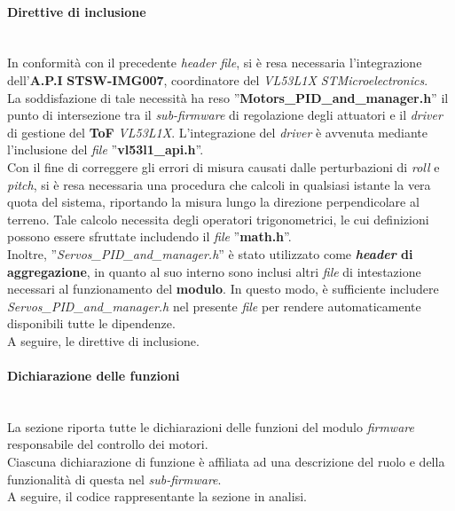 \paragraph{Direttive di inclusione}\mbox{}\\
In conformità con il precedente \textit{header file}, si è resa necessaria l'integrazione dell'\textbf{A.P.I} \textbf{STSW-IMG007}, coordinatore del \textit{VL53L1X STMicroelectronics}.\\
La soddisfazione di tale necessità ha reso ''\textbf{Motors\_PID\_and\_manager.h}'' il punto di intersezione tra il \textit{sub-firmware} di regolazione degli attuatori e il \textit{driver} di gestione del \textbf{ToF} \textit{VL53L1X}.
L'integrazione del \textit{driver} è avvenuta mediante l'inclusione del \textit{file} ''\textbf{vl53l1\_api.h}''.\\
Con il fine di correggere gli errori di misura causati dalle perturbazioni di \textit{roll} e \textit{pitch}, si è resa necessaria una procedura che calcoli in qualsiasi istante la vera quota del sistema, riportando la misura lungo la direzione perpendicolare al terreno. Tale calcolo necessita degli operatori trigonometrici, le cui definizioni possono essere
sfruttate includendo il \textit{file} ''\textbf{math.h}''.\\
Inoltre, ''\textit{Servos\_PID\_and\_manager.h}'' è stato utilizzato come \textbf{\textit{header} di aggregazione}, in quanto al suo interno sono inclusi altri \textit{file} di intestazione necessari al funzionamento del \textbf{modulo}. In questo modo, è sufficiente includere \textit{Servos\_PID\_and\_manager.h} nel presente \textit{file} per rendere automaticamente disponibili tutte le dipendenze.\\
A seguire, le direttive di inclusione.


\paragraph{Dichiarazione delle funzioni}\mbox{}\\
La sezione riporta tutte le dichiarazioni delle funzioni del modulo \textit{firmware} responsabile del controllo dei motori.\\
Ciascuna dichiarazione di funzione è affiliata ad una descrizione del ruolo e della funzionalità di questa nel \textit{sub-firmware}.\\
A seguire, il codice rappresentante la sezione in analisi. 


